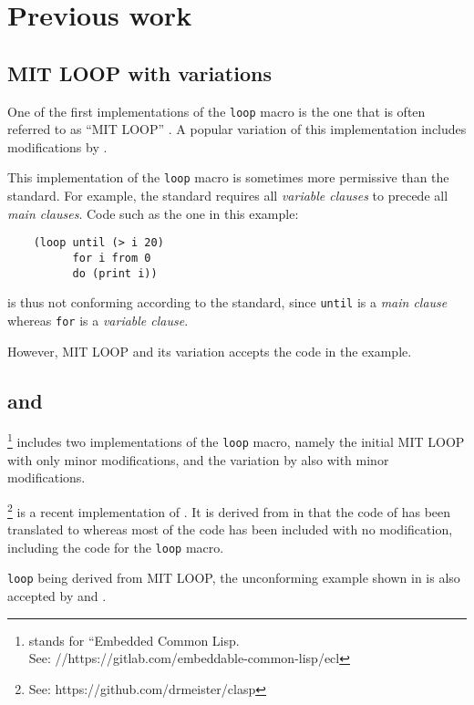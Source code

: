 \section{Previous work}

\subsection{MIT LOOP with variations}
\label{sec-mit-loop}

One of the first implementations of the \commonlisp{} \texttt{loop}
macro is the one that is often referred to as ``MIT LOOP''
\cite{Burke:Moon:MIT.loop}.  A popular variation of this
implementation includes modifications by \symbolics{}.

This implementation of the \texttt{loop} macro is sometimes more
permissive than the \commonlisp{} standard.  For example, the standard
requires all \emph{variable clauses} to precede all \emph{main
  clauses}.  Code such as the one in this example:

\begin{verbatim}
    (loop until (> i 20)
          for i from 0
          do (print i))
\end{verbatim}

\noindent
is thus not conforming according to the standard, since \texttt{until}
is a \emph{main clause} whereas \texttt{for} is a \emph{variable
  clause}.

However, MIT LOOP and its variation accepts the code in the example.

\subsection{\ecl{} and \clasp{}}

\ecl{}%
\footnote{\ecl{} stands for ``Embedded Common Lisp.\\
See: //https://gitlab.com/embeddable-common-lisp/ecl}
includes two implementations of the \texttt{loop} macro, namely
the initial MIT LOOP with only minor modifications, and the variation
by \symbolics{} also with minor modifications.

\clasp{}%
\footnote{See: https://github.com/drmeister/clasp}
is a recent implementation of \commonlisp{}.  It is derived
from \ecl{} in that the \clanguage{} code of \ecl{} has been
translated to \cplusplus{} whereas most of the \commonlisp{} code has
been included with no modification, including the code for the
\texttt{loop} macro.

\ecl{} \texttt{loop} being derived from MIT LOOP, the unconforming
example shown in  is also accepted by \ecl{} and
\clasp{}.

